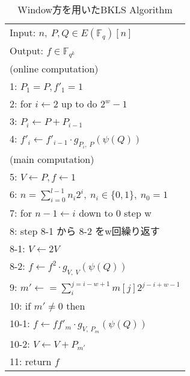 \documentclass[twocolumn]{jsarticle} %
\begin{document}
\begin{table}[htbp]
 \begin{center}
  \begin{tabular}{|l|}
     \hline
     Input: $n, \ P, Q \in E(\mathbb{F}_q)[n]$ \\
     Output: $f \in \mathbb{F}_{q^k}$  \\
     \hline
     (online computation) \\
     1: \quad $P_1 = P, f'_1=1 $\\
     2: \quad for $i \gets 2$ up to do $2^w -1$\\
     3: \quad \quad $P_i \gets P + P_{i-1} $\\
     4: \quad \quad $f'_i \gets f'_{i-1} \cdot g_{P_i,\ P}(\psi (Q))$\\

     (main computation) \\
     5: \quad $V \gets P, f \gets 1 $\\
     6: \quad $n=\sum^{l - 1}_{i=0} n_i 2^i, \ n_i \in \{0,1\},\ n_0 = 1$\\

     7: \quad for $ n-1 \gets i$ down to 0 step w\\
     8: \quad step 8-1 から 8-2 をw回繰り返す\\
     8-1: \quad \quad $V \gets 2V $\\
     8-2: \quad \quad $f \gets f^2 \cdot g_{V,\ V}(\psi (Q))$\\

     9: \quad $m' \gets =\sum^{j=i-w+1}_{i} m[j]2^{j-i+w-1} $\\
     10: \quad if $m' \neq 0$ then\\
     10-1: \quad \quad $f \gets ff'_m \cdot g_{V,\ P_m}(\psi (Q))$ \\
     10-2: \quad \quad $V \gets V + P_{m'} $\\
     11: \quad return $f$\\
     \hline
  \end{tabular}
 \end{center}
 \caption{Window方を用いたBKLS Algorithm}
\end{table}
\end{document}
